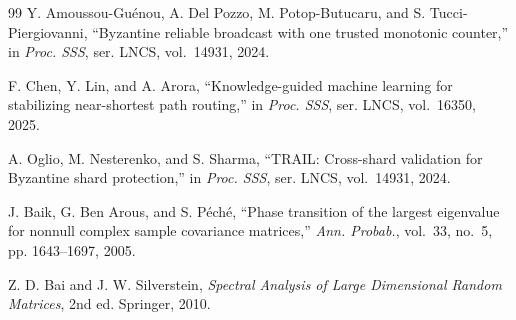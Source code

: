 \begin{thebibliography}{99}
 Y. Amoussou-Gu\'{e}nou, A. Del Pozzo, M. Potop-Butucaru, and S. Tucci-Piergiovanni, ``Byzantine reliable broadcast with one trusted monotonic counter,'' in \textit{Proc. SSS}, ser. LNCS, vol.~14931, 2024.

 F. Chen, Y. Lin, and A. Arora, ``Knowledge-guided machine learning for stabilizing near-shortest path routing,'' in \textit{Proc. SSS}, ser. LNCS, vol.~16350, 2025.

 A. Oglio, M. Nesterenko, and S. Sharma, ``TRAIL: Cross-shard validation for Byzantine shard protection,'' in \textit{Proc. SSS}, ser. LNCS, vol.~14931, 2024.

 J. Baik, G. Ben Arous, and S. P\'{e}ch\'{e}, ``Phase transition of the largest eigenvalue for nonnull complex sample covariance matrices,'' \textit{Ann. Probab.}, vol.~33, no.~5, pp. 1643--1697, 2005.

 Z. D. Bai and J. W. Silverstein, \textit{Spectral Analysis of Large Dimensional Random Matrices}, 2nd ed. Springer, 2010.
\end{thebibliography}

